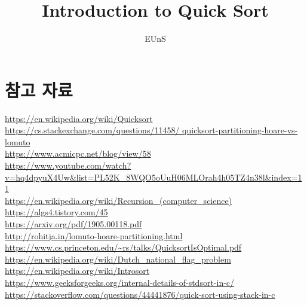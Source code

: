 \documentclass{oblivoir}
\title{Introduction to Quick Sort}
\author{EUnS}
\begin{document}
    

\maketitle


\tableofcontents

















\listoffigures

\listoftables

\newpage
\section*{참고 자료}
\url{https://en.wikipedia.org/wiki/Quicksort} \\
\url{https://cs.stackexchange.com/questions/11458/ quicksort-partitioning-hoare-vs-lomuto} \\
\url{https://www.acmicpc.net/blog/view/58} \\
\url{https://www.youtube.com/watch?v=hq4dpyuX4Uw&list=PL52K_8WQO5oUuH06MLOrah4h05TZ4n38l&index=11} \\
\url{https://en.wikipedia.org/wiki/Recursion_(computer_science)} \\
\url{https://algs4.tistory.com/45} \\
\url{https://arxiv.org/pdf/1905.00118.pdf} \\
\url{http://rohitja.in/lomuto-hoare-partitioning.html} \\


\url{https://www.cs.princeton.edu/~rs/talks/QuicksortIsOptimal.pdf}
\url{https://en.wikipedia.org/wiki/Dutch_national_flag_problem}\\
\url{https://en.wikipedia.org/wiki/Introsort}\\
\url{https://www.geeksforgeeks.org/internal-details-of-stdsort-in-c/}
\url{https://stackoverflow.com/questions/44441876/quick-sort-using-stack-in-c}
\end{document}
